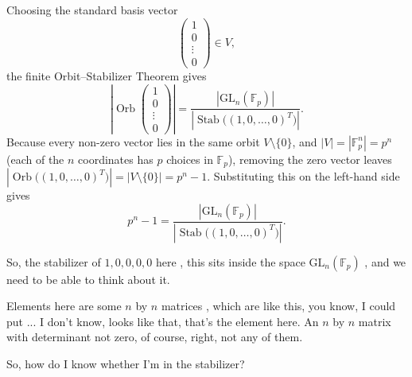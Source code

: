 \begin{content}
Choosing the standard basis vector
\[
\begin{pmatrix} 1 \\ 0 \\ \vdots \\ 0 \end{pmatrix} \in V,
\]
the finite Orbit--Stabilizer Theorem gives
\[
\left|\operatorname{Orb}\begin{pmatrix} 1 \\ 0 \\ \vdots \\ 0 \end{pmatrix}\right| = \frac{\left|\mathrm{GL}_n(\mathbb{F}_p)\right|}{\left|\operatorname{Stab}\bigl((1, 0, \dots, 0)^T\bigr)\right|}.
\]
Because every non-zero vector lies in the same orbit $V \setminus \{0\}$, and $|V| = |\mathbb{F}_p^n| = p^n$ (each of the $n$ coordinates has $p$ choices in $\mathbb{F}_p$), removing the zero vector leaves $\left|\operatorname{Orb}\bigl((1, 0, \dots, 0)^T\bigr)\right| = |V \setminus \{0\}| = p^n - 1$. Substituting this on the left-hand side gives
\begin{equation}\label{eq:gln-orb-stab-step1}
p^n - 1 = \frac{\left|\mathrm{GL}_n(\mathbb{F}_p)\right|}{\left|\operatorname{Stab}\bigl((1, 0, \dots, 0)^T\bigr)\right|}.
\end{equation}
\end{content}

\begin{hidden}
\end{hidden}

\begin{speech}[01:15:22 - 01:16:08]
So, the stabilizer of $1, 0, 0, 0, 0$ here , this sits inside the space $\mathrm{GL}_n(\mathbb{F}_p)$ , and we need to be able to think about it.

Elements here are some $n$ by $n$ matrices , which are like this, you know, I could put ... I don't know, looks like that, that's the element here. An $n$ by $n$ matrix with determinant not zero, of course, right, not any of them.

So, how do I know whether I'm in the stabilizer?
\end{speech}

